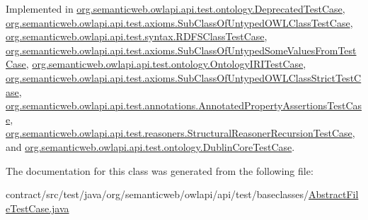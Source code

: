 Implemented in \hyperlink{classorg_1_1semanticweb_1_1owlapi_1_1api_1_1test_1_1ontology_1_1_deprecated_test_case_a924d302eeef22f3256e90dfc761be0c2}{org.\-semanticweb.\-owlapi.\-api.\-test.\-ontology.\-Deprecated\-Test\-Case}, \hyperlink{classorg_1_1semanticweb_1_1owlapi_1_1api_1_1test_1_1axioms_1_1_sub_class_of_untyped_o_w_l_class_test_case_a2755b9dd86247acfab300720ad4f4c34}{org.\-semanticweb.\-owlapi.\-api.\-test.\-axioms.\-Sub\-Class\-Of\-Untyped\-O\-W\-L\-Class\-Test\-Case}, \hyperlink{classorg_1_1semanticweb_1_1owlapi_1_1api_1_1test_1_1syntax_1_1_r_d_f_s_class_test_case_a40930d87bb05720d2c09e0a5845a00a7}{org.\-semanticweb.\-owlapi.\-api.\-test.\-syntax.\-R\-D\-F\-S\-Class\-Test\-Case}, \hyperlink{classorg_1_1semanticweb_1_1owlapi_1_1api_1_1test_1_1axioms_1_1_sub_class_of_untyped_some_values_from_test_case_a24ced07ed6fb4bc031aa42e48f038493}{org.\-semanticweb.\-owlapi.\-api.\-test.\-axioms.\-Sub\-Class\-Of\-Untyped\-Some\-Values\-From\-Test\-Case}, \hyperlink{classorg_1_1semanticweb_1_1owlapi_1_1api_1_1test_1_1ontology_1_1_ontology_i_r_i_test_case_ae2dca15563aa0fad20a0218ad493c836}{org.\-semanticweb.\-owlapi.\-api.\-test.\-ontology.\-Ontology\-I\-R\-I\-Test\-Case}, \hyperlink{classorg_1_1semanticweb_1_1owlapi_1_1api_1_1test_1_1axioms_1_1_sub_class_of_untyped_o_w_l_class_strict_test_case_a2cd7c68497a05065424248fc27762821}{org.\-semanticweb.\-owlapi.\-api.\-test.\-axioms.\-Sub\-Class\-Of\-Untyped\-O\-W\-L\-Class\-Strict\-Test\-Case}, \hyperlink{classorg_1_1semanticweb_1_1owlapi_1_1api_1_1test_1_1annotations_1_1_annotated_property_assertions_test_case_a3be7d1b9de316f5c5bf9dbd8f2636093}{org.\-semanticweb.\-owlapi.\-api.\-test.\-annotations.\-Annotated\-Property\-Assertions\-Test\-Case}, \hyperlink{classorg_1_1semanticweb_1_1owlapi_1_1api_1_1test_1_1reasoners_1_1_structural_reasoner_recursion_test_case_a165e5cb0572b9567db162352dae4d27d}{org.\-semanticweb.\-owlapi.\-api.\-test.\-reasoners.\-Structural\-Reasoner\-Recursion\-Test\-Case}, and \hyperlink{classorg_1_1semanticweb_1_1owlapi_1_1api_1_1test_1_1ontology_1_1_dublin_core_test_case_abc54f4c39833f8e1bee845c2865929d5}{org.\-semanticweb.\-owlapi.\-api.\-test.\-ontology.\-Dublin\-Core\-Test\-Case}.



The documentation for this class was generated from the following file\-:\begin{DoxyCompactItemize}
\item 
contract/src/test/java/org/semanticweb/owlapi/api/test/baseclasses/\hyperlink{_abstract_file_test_case_8java}{Abstract\-File\-Test\-Case.\-java}\end{DoxyCompactItemize}
